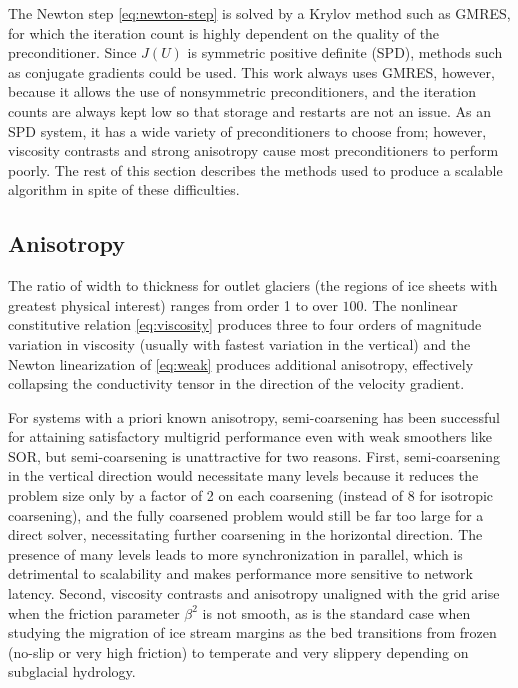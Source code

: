\documentclass[draft,lineno,jgrga]{AGUTeX}
\begin{document}
\begin{article}
The Newton step \eqref{eq:newton-step} is solved by a Krylov method such as GMRES, for which the iteration count is highly dependent on the quality of the preconditioner.  Since $J(U)$ is symmetric positive definite (SPD), methods such as conjugate gradients could be used. This work always uses GMRES, however, because it allows the use of nonsymmetric preconditioners, and the iteration counts are always kept low so that storage and restarts are not an issue.  As an SPD system, it has a wide variety of preconditioners to choose from; however, viscosity contrasts and strong anisotropy cause most preconditioners to perform poorly.  The rest of this section describes the methods used to produce a scalable algorithm in spite of these difficulties.

\subsection{Anisotropy}
The ratio of width to thickness for outlet glaciers (the regions of ice sheets with greatest physical interest) ranges from order 1 to over $100$.  The nonlinear constitutive relation \eqref{eq:viscosity} produces three to four orders of magnitude variation in viscosity (usually with fastest variation in the vertical) and the Newton linearization of \eqref{eq:weak} produces additional anisotropy, effectively collapsing the conductivity tensor in the direction of the velocity gradient.

For systems with a priori known anisotropy, semi-coarsening has been successful for attaining
satisfactory multigrid performance even with weak smoothers like SOR, but semi-coarsening is
unattractive for two reasons.  First, semi-coarsening in the vertical direction would necessitate
many levels because it reduces the problem size only by a factor of 2 on each coarsening (instead of
8 for isotropic coarsening), and the fully coarsened problem would still be far too large for a
direct solver, necessitating further coarsening in the horizontal direction.  The presence of many
levels leads to more synchronization in parallel, which is detrimental to scalability and makes
performance more sensitive to network latency.  Second, viscosity contrasts and anisotropy
unaligned with the grid arise when the friction parameter $\beta^2$ is not smooth, as is the standard
case when studying the migration of ice stream margins as the bed transitions from frozen (no-slip
or very high friction) to temperate and very slippery depending on subglacial hydrology.


\end{article}
\end{document}
